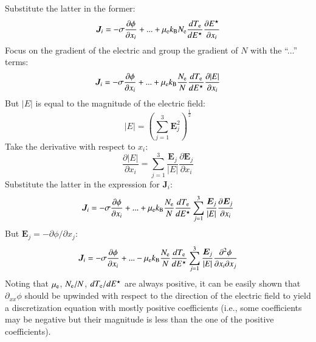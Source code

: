 \documentclass{warpdoc}
\newcommand{\nd}{3}
\renewcommand{\vec}[1]{\bm{#1}}
\begin{document}
% 
Substitute the latter in the former:
%
\begin{equation}
 \vec{J}_i = 
- \sigma\frac{\partial \phi}{\partial x_i}
+ ...
+ \mu_{\rm e} k_{\rm B} N_{\rm e} \frac{d T_{\rm e}}{d E^\star}\frac{\partial E^\star}{\partial x_i}
\end{equation}
%
Focus on the gradient of the electric and group the gradient of $N$ with the ``...'' terms:
%
\begin{equation}
 \vec{J}_i = 
- \sigma\frac{\partial \phi}{\partial x_i}
+ ...
+ \mu_{\rm e} k_{\rm B} \frac{N_{\rm e}}{N} \frac{d T_{\rm e}}{d E^\star}\frac{\partial |E|}{\partial x_i}
\end{equation}
%
But $|E|$ is equal to the magnitude of the electric field:
%
\begin{equation}
  |E|= \left(\sum_{j=1}^\nd \vec{E}_j^2 \right)^\frac{1}{2}
\end{equation}
%
Take the derivative with respect to $x_i$:
%
\begin{equation}
  \frac{\partial |E|}{\partial x_i} = \sum_{j=1}^\nd \frac{\vec{E}_j}{|E|} \frac{\partial \vec{E}_j}{\partial x_i} 
\end{equation}
%
Substitute the latter in the expression for $\vec{J}_i$:
%
\begin{equation}
 \vec{J}_i = 
- \sigma\frac{\partial \phi}{\partial x_i}
+ ...
+ \mu_{\rm e} k_{\rm B} \frac{N_{\rm e}}{N} \frac{d T_{\rm e}}{d E^\star}\sum_{j=1}^\nd \frac{\vec{E}_j}{|E|} \frac{\partial \vec{E}_j}{\partial x_i}
\end{equation}
%
But $\vec{E}_j=-\partial \phi/\partial x_j$:
%
\begin{equation}
 \vec{J}_i = 
- \sigma\frac{\partial \phi}{\partial x_i}
+ ...
- \mu_{\rm e} k_{\rm B} \frac{N_{\rm e}}{N} \frac{d T_{\rm e}}{d E^\star}\sum_{j=1}^\nd \frac{\vec{E}_j}{|E|}  \frac{\partial^2 \phi}{\partial x_i \partial x_j}
\end{equation}
%
Noting that $\mu_{\rm e}$, ${N_{\rm e}}/{N}$, ${d T_{\rm e}}/{d E^\star}$ are always positive, it can be easily shown that $\partial_{xx}\phi$ should be upwinded with respect to the direction of the electric field to yield a discretization equation with mostly positive coefficients (i.e., some coefficients may be negative but their magnitude is less than the one of the positive coefficients).   
\end{document}
